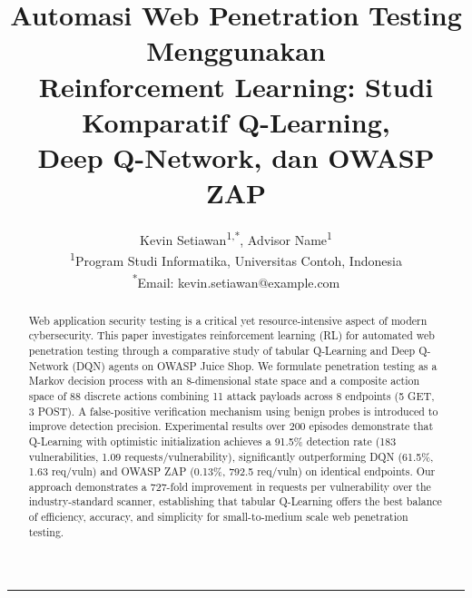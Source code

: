 \documentclass[a4paper,12pt]{article}
\begin{document}
\title{\textbf{Automasi Web Penetration Testing Menggunakan\\Reinforcement Learning: Studi Komparatif Q-Learning,\\Deep Q-Network, dan OWASP ZAP}}
\author{%
  Kevin Setiawan\textsuperscript{1,*}, Advisor Name\textsuperscript{1}\\
  \textsuperscript{1}Program Studi Informatika, Universitas Contoh, Indonesia\\
  \textsuperscript{*}Email: kevin.setiawan@example.com
}
\date{}
\maketitle

\begin{abstract}
Web application security testing is a critical yet resource-intensive aspect of modern cybersecurity. This paper investigates reinforcement learning (RL) for automated web penetration testing through a comparative study of tabular Q-Learning and Deep Q-Network (DQN) agents on OWASP Juice Shop. We formulate penetration testing as a Markov decision process with an 8-dimensional state space and a composite action space of 88 discrete actions combining 11 attack payloads across 8 endpoints (5 GET, 3 POST). A false-positive verification mechanism using benign probes is introduced to improve detection precision. Experimental results over 200 episodes demonstrate that Q-Learning with optimistic initialization achieves a 91.5\% detection rate (183 vulnerabilities, 1.09 requests/vulnerability), significantly outperforming DQN (61.5\%, 1.63 req/vuln) and OWASP ZAP (0.13\%, 792.5 req/vuln) on identical endpoints. Our approach demonstrates a 727-fold improvement in requests per vulnerability over the industry-standard scanner, establishing that tabular Q-Learning offers the best balance of efficiency, accuracy, and simplicity for small-to-medium scale web penetration testing.
\end{abstract}

\begin{center}
\rule{0.8\textwidth}{0.5pt}
\end{center}
\end{document}
